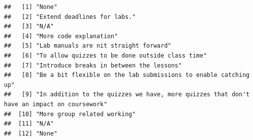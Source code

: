 \documentclass[
]{article}
\begin{document}
\begin{verbatim}
##   [1] "None"                                                                                                                                                                                                                  
##   [2] "Extend deadlines for labs."                                                                                                                                                                                            
##   [3] "N/A"                                                                                                                                                                                                                   
##   [4] "More code explanation"                                                                                                                                                                                                 
##   [5] "Lab manuals are nit straight forward"                                                                                                                                                                                  
##   [6] "To allow quizzes to be done outside class time"                                                                                                                                                                        
##   [7] "Introduce breaks in between the lessons"                                                                                                                                                                               
##   [8] "Be a bit flexible on the lab submissions to enable catching up"                                                                                                                                                        
##   [9] "In addition to the quizzes we have, more quizzes that don't have an impact on coursework"                                                                                                                              
##  [10] "More group related working"                                                                                                                                                                                            
##  [11] "N/A"                                                                                                                                                                                                                   
##  [12] "None"                                                                                                                                                                                                                  

\end{verbatim}
\end{document}

